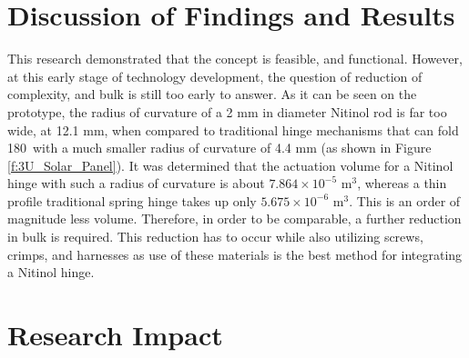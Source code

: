 \section{Discussion of Findings and Results}

This research demonstrated that the concept is feasible, and functional. However, at this early stage of technology development, the question of reduction of complexity, and bulk is still too early to answer. As it can be seen on the prototype, the radius of curvature of a 2 mm in diameter Nitinol rod is far too wide, at 12.1 mm, when compared to traditional hinge mechanisms that can fold 180\textdegree\ with a much smaller radius of curvature of 4.4 mm (as shown in Figure \ref{f:3U_Solar_Panel}). It was determined that the actuation volume for a Nitinol hinge with such a radius of curvature is about $7.864 \times 10^{-5}$ m$^3$, whereas a thin profile traditional spring hinge takes up only $5.675 \times 10^{-6}$ m$^3$. This is an order of magnitude less volume. %
Therefore, in order to be comparable, a further reduction in bulk is required. 
This reduction has to occur while also utilizing screws, crimps, and harnesses as use of these materials is the best method for integrating a Nitinol hinge.  
\section{Research Impact}

